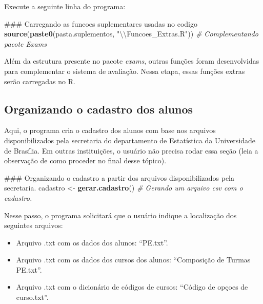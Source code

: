 \documentclass[a4paper]{report}
\newenvironment{Shaded}{\begin{snugshade}}{\end{snugshade}}
\newcommand{\KeywordTok}[1]{\textcolor[rgb]{0.13,0.29,0.53}{\textbf{#1}}}
\newcommand{\CharTok}[1]{\textcolor[rgb]{0.31,0.60,0.02}{#1}}
\newcommand{\StringTok}[1]{\textcolor[rgb]{0.31,0.60,0.02}{#1}}
\newcommand{\CommentTok}[1]{\textcolor[rgb]{0.56,0.35,0.01}{\textit{#1}}}
\newcommand{\NormalTok}[1]{#1}
\providecommand{\tightlist}{%
  \setlength{\itemsep}{0pt}\setlength{\parskip}{0pt}}
\begin{document}
Execute a seguinte linha do programa:

\begin{Shaded}
\begin{Highlighting}[]
\NormalTok{### Carregando as funcoes suplementares usadas no codigo}
\KeywordTok{source}\NormalTok{(}\KeywordTok{paste0}\NormalTok{(pasta.suplementos, }\StringTok{"}\CharTok{\textbackslash{}\textbackslash{}}\StringTok{Funcoes_Extras.R"}\NormalTok{))  }\CommentTok{# Complementando pacote Exams }
\end{Highlighting}
\end{Shaded}

Além da estrutura presente no pacote \emph{exams}, outras funções foram
desenvolvidas para complementar o sistema de avaliação. Nessa etapa,
essas funções extras serão carregadas no R.

\subsection{Organizando o cadastro dos alunos}

Aqui, o programa cria o cadastro dos alunos com base nos arquivos
disponibilizados pela secretaria do departamento de Estatística da
Universidade de Brasília. Em outras instituições, o usuário não precisa
rodar essa seção (leia a observação de como proceder no final desse
tópico).

\begin{Shaded}
\begin{Highlighting}[]
\NormalTok{### Organizando o cadastro a partir dos arquivos disponibilizados pela secretaria.}
\NormalTok{cadastro <-}\StringTok{ }\KeywordTok{gerar.cadastro}\NormalTok{() }\CommentTok{# Gerando um arquivo csv com o cadastro.}
\end{Highlighting}
\end{Shaded}

Nesse passo, o programa solicitará que o usuário indique a localização
dos seguintes arquivos:

\begin{itemize}
\tightlist
\item
  Arquivo .txt com os dados dos alunos: ``PE.txt''.
\item
  Arquivo .txt com os dados dos cursos dos alunos: ``Composição de
  Turmas PE.txt''.
\item
  Arquivo .txt com o dicionário de códigos de cursos: ``Código de opçoes
  de curso.txt''.
\end{itemize}
\end{document}
